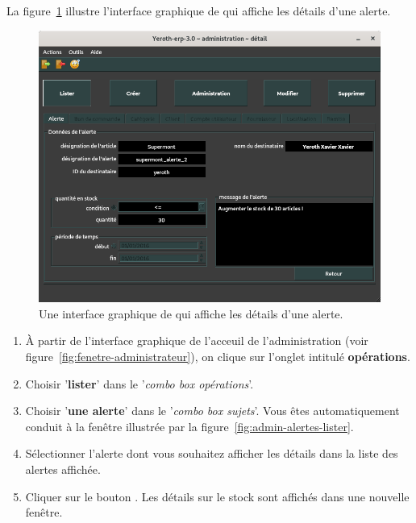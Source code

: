\label{sec:administration-alertes}


La figure~\ref{fig:admin-alertes-afficher-details} illustre
l'interface graphique de \yeroth qui affiche les d\'etails
d'une alerte.\\

\begin{figure}[!htpb]
	\centering
	\includegraphics[scale=0.45]{images/alerte-afficher-details.png}
	\caption{Une interface graphique de \yeroth qui affiche les d\'etails
	d'une alerte.}\label{fig:admin-alertes-afficher-details}
\end{figure}

\begin{enumerate}[1)]
	\item \`A partir de l'interface graphique de l'acceuil de
		l'administration (voir figure~\ref{fig:fenetre-administrateur}),
		on clique sur l'onglet intitul\'e \textbf{op\'erations}. 
		
	\item Choisir '\textbf{lister}' dans le '\emph{combo box
		op\'erations}'.
		
	\item Choisir '\textbf{une alerte}' dans le '\emph{combo box
		sujets}'. Vous \^etes automatiquement conduit \`a la fen\^etre
		illustr\'ee par la figure~\ref{fig:admin-alertes-lister}.
		
	\item S\'electionner l'alerte dont vous souhaitez afficher
		les d\'etails dans la liste des alertes affich\'ee.
		
	\item Cliquer sur le bouton . Les d\'etails
		sur le stock sont affich\'es dans une nouvelle fen\^etre.
\end{enumerate}

